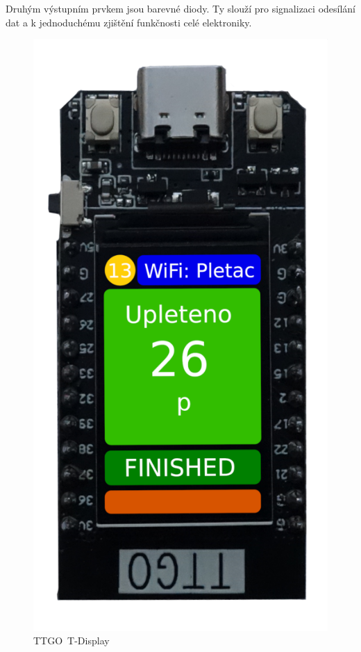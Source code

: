 Druhým výstupním prvkem jsou barevné diody.
Ty slouží pro signalizaci odesílání dat a k jednoduchému zjištění funkčnosti celé elektroniky.

\begin{figure}[htbp]
    \centering
    \includegraphics[width=\textwidth/3 ]{img/ESP32.png}
    \caption{TTGO~T-Display}
    \label{fig:TTGO}
\end{figure}


